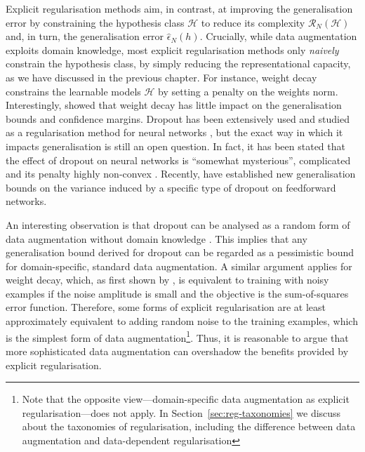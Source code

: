 {Explicit regularisation methods aim, in contrast, at improving the generalisation error by constraining the hypothesis class $\mathcal{H}$ to reduce its complexity $\mathcal{R}_{N}(\mathcal{H})$ and, in turn, the generalisation error $\hat{\epsilon}_{N}(h)$. Crucially, while data augmentation exploits domain knowledge, most explicit regularisation methods only \textit{naively} constrain the hypothesis class, by simply reducing the representational capacity, as we have discussed in the previous chapter. For instance, weight decay constrains the learnable models $\mathcal{H}$ by setting a penalty on the weights norm. Interestingly, \citet{bartlett2017boundsnn} showed that weight decay has little impact on the generalisation bounds and confidence margins. Dropout has been extensively used and studied as a regularisation method for neural networks \citep{wager2013dropout}, but the exact way in which it impacts generalisation is still an open question. In fact, it has been stated that the effect of dropout on neural networks is ``somewhat mysterious'', complicated and its penalty highly non-convex \citep{helmbold2017dropout}. Recently, \citet{mou2018dropout} have established new generalisation bounds on the variance induced by a specific type of dropout on feedforward networks. 

An interesting observation is that dropout can be analysed as a random form of data augmentation without domain knowledge \citep{bouthillier2015dropoutasdaug}. This implies that any generalisation bound derived for dropout can be regarded as a pessimistic bound for domain-specific, standard data augmentation. A similar argument applies for weight decay, which, as first shown by \citet{bishop1995tikhonov}, is equivalent to training with noisy examples if the noise amplitude is small and the objective is the sum-of-squares error function. Therefore, some forms of explicit regularisation are at least approximately equivalent to adding random noise to the training examples, which is the simplest form of data augmentation\footnote{Note that the opposite view---domain-specific data augmentation as explicit regularisation---does not apply. In Section~\ref{sec:reg-taxonomies} we discuss about the taxonomies of regularisation, including the difference between data augmentation and data-dependent regularisation}. Thus, it is reasonable to argue that more sophisticated data augmentation can overshadow the benefits provided by explicit regularisation.

}
